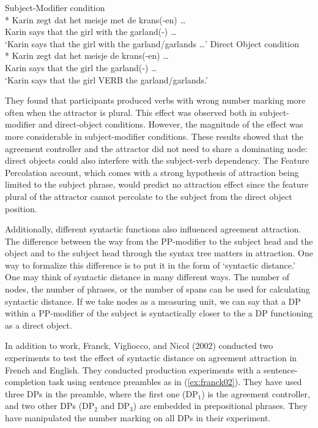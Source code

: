 \ea \label{ex:hartsuiker1}
  \ea \label{ex:hartsuiker1_subj_mod} {Subject-Modifier condition}\\*
    \gll Karin zegt dat het {meisje} met de {krans(-en)} \ldots \\
    Karin says that the girl with the garland(-\Pl{}) \ldots \\
    \glt `Karin says that the girl with the garland/garlands \ldots'
  \ex \label{ex:hartsuiker1_dobj} {Direct Object condition}\\*
    \gll Karin zegt dat het meisje de krans(-en) \ldots \\
    Karin says that the girl the garland(-\Pl{}) \ldots \\
    \glt `Karin says that the girl VERB the garland/garlands.'
  \z
\z

They found that participants produced verbs with wrong number marking more often when the attractor is plural. This effect was observed both in subject-modifier and direct-object conditions. However, the magnitude of the effect was more considerable in subject-modifier conditions. These results showed that the agreement controller and the attractor did not need to share a dominating node: direct objects could also interfere with the subject-verb dependency. The Feature Percolation account, which comes with a strong hypothesis of attraction being limited to the subject phrase, would predict no attraction effect since the feature plural of the attractor cannot percolate to the subject from the direct object position. 

Additionally, different syntactic functions also influenced agreement attraction. The difference between the way from the PP-modifier to the subject head and the object and to the subject head through the syntax tree matters in attraction. One way to formalize this difference is to put it in the form of `syntactic distance.' One may think of syntactic distance in many different ways. The number of nodes, the number of phrases, or the number of spans can be used for calculating syntactic distance. If we take nodes as a measuring unit, we can say that a DP within a PP-modifier of the subject is syntactically closer to the a DP functioning as a direct object.

In addition to \cites{BockCutting1992} work, Franck, Vigliocco, and Nicol (2002) conducted two experiments to test the effect of syntactic distance on agreement attraction in French and English. They conducted production experiments with a sentence-completion task using sentence preambles as in (\ref{ex:franck02}). They have used three DPs in the preamble, where the first one (DP$_1$) is the agreement controller, and two other DPs (DP$_2$ and DP$_3$) are embedded in prepositional phrases. They have manipulated the number marking on all DPs in their experiment. 

